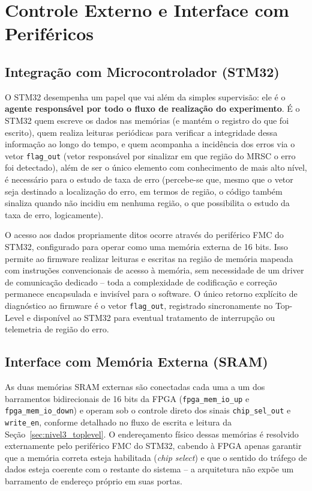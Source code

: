 \documentclass[12pt,a4paper]{article}
\begin{document}
\section{Controle Externo e Interface com Periféricos}
\label{sec:controle_perifericos}

\subsection{Integração com Microcontrolador (STM32)}

O STM32 desempenha um papel que vai além da simples supervisão: ele é o 
\textbf{agente responsável por todo o fluxo de realização do experimento}. 
É o STM32 quem escreve os dados nas memórias (e mantém o registro do que 
foi escrito), quem realiza leituras periódicas para verificar a integridade 
dessa informação ao longo do tempo, e quem acompanha a incidência dos erros via o vetor \texttt{flag\_out} (vetor responsável por sinalizar em que região do MRSC o erro foi detectado), além de ser o único 
elemento com conhecimento de mais alto nível, é necessário para o estudo de taxa de erro (percebe-se que, mesmo que o vetor seja destinado a localização do erro, em termos de região, o código também sinaliza quando não incidiu em nenhuma região, o que possibilita o estudo da taxa de erro, logicamente).

O acesso aos dados propriamente ditos ocorre através do periférico FMC do 
STM32, configurado para operar como uma memória externa de 16 bits. Isso 
permite ao firmware realizar leituras e escritas na região de memória 
mapeada com instruções convencionais de acesso à memória, sem necessidade 
de um driver de comunicação dedicado -- toda a complexidade de codificação 
e correção permanece encapsulada e invisível para o software. O único 
retorno explícito de diagnóstico ao firmware é o vetor \texttt{flag\_out}, 
registrado sincronamente no Top-Level e disponível ao STM32 para eventual 
tratamento de interrupção ou telemetria de região do erro.


\subsection{Interface com Memória Externa (SRAM)}

As duas memórias SRAM externas são conectadas cada uma a um dos barramentos 
bidirecionais de 16 bits da FPGA (\texttt{fpga\_mem\_io\_up} e 
\texttt{fpga\_mem\_io\_down}) e operam sob o controle direto dos sinais 
\texttt{chip\_sel\_out} e \texttt{write\_en}, conforme detalhado no fluxo 
de escrita e leitura da Seção~\ref{sec:nivel3_toplevel}. O endereçamento 
físico dessas memórias é resolvido externamente pelo periférico FMC do 
STM32, cabendo à FPGA apenas garantir que a memória correta esteja 
habilitada (\textit{chip select}) e que o sentido do tráfego de dados 
esteja coerente com o restante do sistema -- a arquitetura não expõe um 
barramento de endereço próprio em suas portas.
\end{document}
